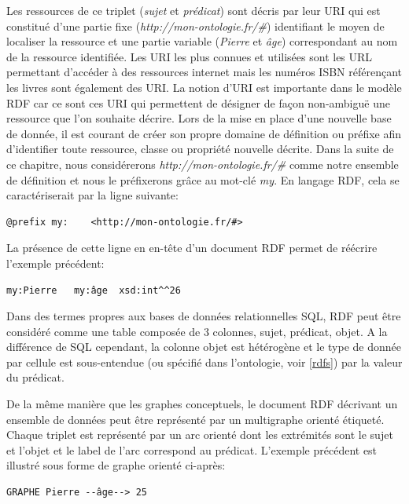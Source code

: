 Les ressources de ce triplet (\textit{sujet} et \textit{prédicat}) sont décris par leur URI qui est constitué d'une partie fixe (\textit{http://mon-ontologie.fr/\#}) identifiant le moyen de localiser la ressource et une partie variable (\textit{Pierre} et \textit{âge}) correspondant au nom de la ressource identifiée. Les URI les plus connues et utilisées sont les URL permettant d'accéder à des ressources internet mais les numéros ISBN référençant les livres sont également des URI. La notion d'URI est importante dans le modèle RDF car ce sont ces URI qui permettent de désigner de façon non-ambiguë une ressource que l'on souhaite décrire. Lors de la mise en place d'une nouvelle base de donnée, il est courant de créer son propre domaine de définition ou préfixe afin d'identifier toute ressource, classe ou propriété nouvelle décrite. Dans la suite de ce chapitre, nous considérerons \textit{http://mon-ontologie.fr/\#} comme notre ensemble de définition et nous le préfixerons grâce au mot-clé \textit{my}. En langage RDF, cela se caractériserait par la ligne suivante:

\begin{lstlisting}
@prefix my:    <http://mon-ontologie.fr/#>
\end{lstlisting}

La présence de cette ligne en en-tête d'un document RDF permet de réécrire l'exemple précédent:

\begin{lstlisting}
my:Pierre 	my:âge	xsd:int^^26
\end{lstlisting}

Dans des termes propres aux bases de données relationnelles SQL, RDF peut être considéré comme une table composée de 3 colonnes, sujet, prédicat, objet. A la différence de SQL cependant, la colonne objet est hétérogène et le type de donnée par cellule est sous-entendue (ou spécifié dans l'ontologie, voir \ref{rdfs}) par la valeur du prédicat.

De la même manière que les graphes conceptuels, le document RDF décrivant un ensemble de données peut être représenté par un multigraphe orienté étiqueté. Chaque triplet est représenté par un arc orienté dont les extrémités sont le sujet et l'objet et le label de l'arc correspond au prédicat. L'exemple précédent est illustré sous forme de graphe orienté ci-après:

\begin{lstlisting}
GRAPHE Pierre --âge--> 25
\end{lstlisting}

